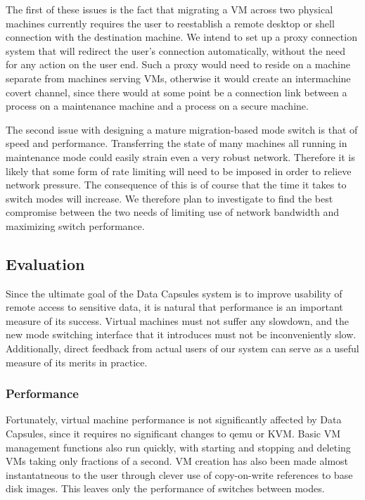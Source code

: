 \documentclass{acm_proc_article-sp}
\begin{document}
The first of these issues is the fact that migrating a VM across two physical
machines currently requires the user to reestablish a remote desktop or shell
connection with the destination machine.  We intend to set up a proxy connection
system that will redirect the user's connection automatically, without the need
for any action on the user end.  Such a proxy would need to reside on a machine
separate from machines serving VMs, otherwise it would create an intermachine
covert channel, since there would at some point be a connection link between a
process on a maintenance machine and a process on a secure machine.

The second issue with designing a mature migration-based mode switch is that of
speed and performance.  Transferring the state of many machines all running in
maintenance mode could easily strain even a very robust network.  Therefore it
is likely that some form of rate limiting will need to be imposed in order to
relieve network pressure.  The consequence of this is of course that the time it
takes to switch modes will increase.  We therefore plan to investigate to find
the best compromise between the two needs of limiting use of network bandwidth
and maximizing switch performance.

\subsection{Evaluation}

Since the ultimate goal of the Data Capsules system is to improve usability of
remote access to sensitive data, it is natural that performance is an important
measure of its success.  Virtual machines must not suffer any slowdown, and the
new mode switching interface that it introduces must not be inconveniently slow.
Additionally, direct feedback from actual users of our system can serve as a
useful measure of its merits in practice.

\subsubsection{Performance}

Fortunately, virtual machine performance is not significantly affected by Data
Capsules, since it requires no significant changes to qemu or KVM.  Basic VM management functions also run quickly, with starting and stopping and deleting VMs taking only fractions of a second.  VM creation has also been made almost instantatneous to the user through clever use of copy-on-write references to base disk images.  This leaves only the performance of switches between modes.
\end{document}
